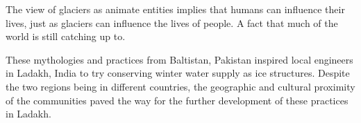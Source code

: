The view of glaciers as animate entities implies that humans can influence their lives, just as glaciers can
influence the lives of people. A fact that much of the world is still catching up to.

These mythologies and practices from Baltistan, Pakistan inspired local engineers in Ladakh, India to try
conserving winter water supply as ice structures. Despite the two regions being in different countries, the
geographic and cultural proximity of the communities paved the way for the further development of these
practices in Ladakh.
